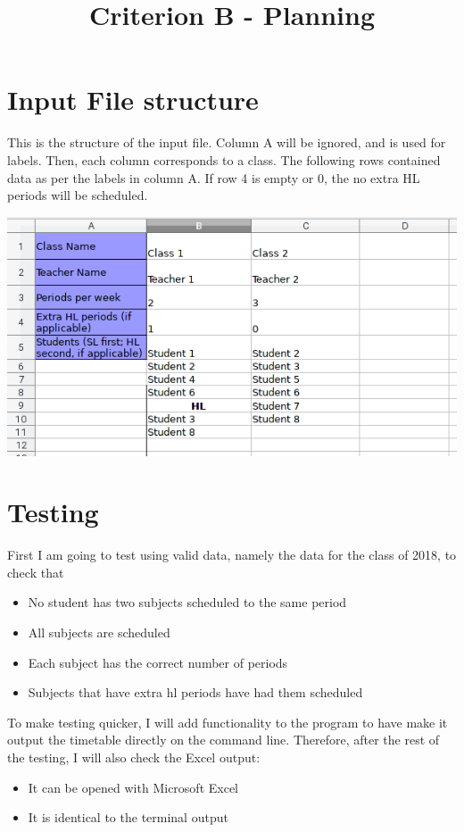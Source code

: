 \documentclass[12pt]{article}
\title{Criterion B - Planning}
\author{}
\date{}
\begin{document}
\maketitle

\section*{Input File structure}
This is the structure of the input file. Column A will be ignored, and is used for labels.
Then, each column corresponds to a class. The following rows contained data as per the
labels in column A. If row 4 is empty or 0, the no extra HL periods will be scheduled. 

\includegraphics[width=\textwidth]{data_file_structure.png}

\section*{Testing}

First I am going to test using valid data, namely the data for the class of 2018, to check
that
%
\begin{itemize}
    \item No student has two subjects scheduled to the same period
    \item All subjects are scheduled
    \item Each subject has the correct number of periods
    \item Subjects that have extra hl periods have had them scheduled
\end{itemize}
%

To make testing quicker, I will add functionality to the program to have make it output the
timetable directly on the command line. Therefore, after the rest of the testing, I will
also check the Excel output:
%
\begin{itemize}
    \item It can be opened with Microsoft Excel
    \item It is identical to the terminal output
\end{itemize}
%
\end{document}
